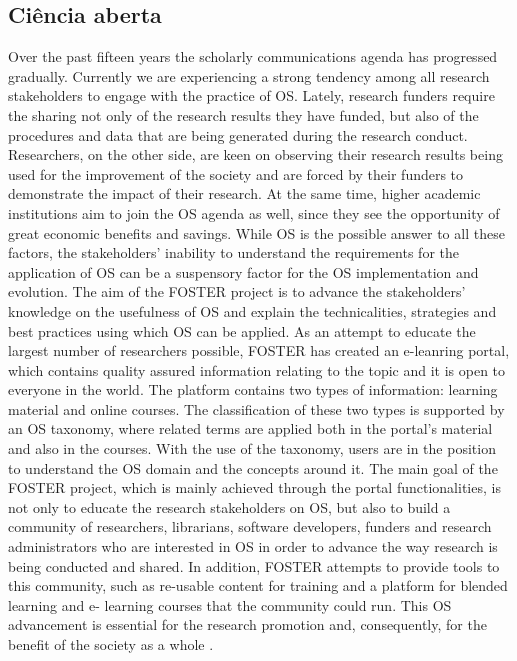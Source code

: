 \subsection{Ciência aberta}

Over the past fifteen years the scholarly communications agenda
has progressed gradually. Currently we are experiencing a strong
tendency among all research stakeholders to engage with the
practice of OS. Lately, research funders require the sharing not
only of the research results they have funded, but also of the
procedures and data that are being generated during the research
conduct. Researchers, on the other side, are keen on observing
their research results being used for the improvement of the
society and are forced by their funders to demonstrate the impact
of their research. At the same time, higher academic institutions
aim to join the OS agenda as well, since they see the opportunity
of great economic benefits and savings. While OS is the possible
answer to all these factors, the stakeholders’ inability to
understand the requirements for the application of OS can be a
suspensory factor for the OS implementation and evolution.
The aim of the FOSTER project is to advance the stakeholders'
knowledge on the usefulness of OS and explain the technicalities,
strategies and best practices using which OS can be applied. As an
attempt to educate the largest number of researchers possible,
FOSTER has created an e-leanring portal, which contains quality
assured information relating to the topic and it is open to everyone
in the world. The platform contains two types of information:
learning material and online courses. The classification of these
two types is supported by an OS taxonomy, where related terms
are applied both in the portal's material and also in the courses.
With the use of the taxonomy, users are in the position to
understand the OS domain and the concepts around it.
The main goal of the FOSTER project, which is mainly achieved
through the portal functionalities, is not only to educate the
research stakeholders on OS, but also to build a community of
researchers, librarians, software developers, funders and research
administrators who are interested in OS in order to advance the
way research is being conducted and shared. In addition, FOSTER
attempts to provide tools to this community, such as re-usable
content for training and a platform for blended learning and e-
learning courses that the community could run. This OS
advancement is essential for the research promotion and,
consequently, for the benefit of the society as a whole
\cite{Nancy2015}.

